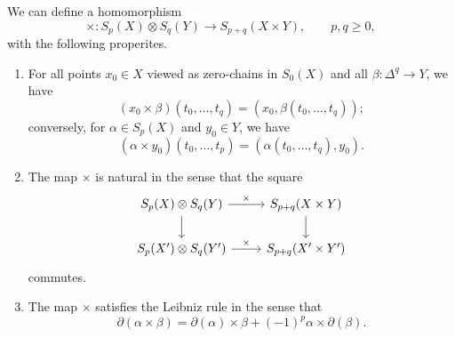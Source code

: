 \documentclass[main.tex]{subfiles}
\begin{document}
\begin{lemma}
  \label{lemma:existence_of_homology_cross_product}
  We can define a homomorphism
  \begin{equation*}
    \times\colon S_{p}(X) \otimes S_{q}(Y) \to S_{p+q}(X \times Y), \qquad p,q \geq 0,
  \end{equation*}
  with the following properites.
  \begin{enumerate}
    \item For all points $x_{0} \in X$ viewed as zero-chains in $S_{0}(X)$ and all $\beta\colon \Delta^{q} \to Y$, we have
      \begin{equation*}
        (x_{0} \times \beta)(t_{0}, \ldots, t_{q}) = (x_{0}, \beta(t_{0}, \ldots, t_{q}));
      \end{equation*}
      conversely, for $\alpha \in S_{p}(X)$ and $y_{0} \in Y$, we have
      \begin{equation*}
        (\alpha \times y_{0})(t_{0}, \ldots, t_{p}) = (\alpha(t_{0}, \ldots, t_{q}), y_{0}).
      \end{equation*}

    \item The map $\times$ is natural in the sense that the square
      \begin{equation*}
        \begin{tikzcd}
          S_{p}(X) \otimes S_{q}(Y)
          \arrow[r, "\times"]
          \arrow[d]
          & S_{p+q}(X \times Y)
          \arrow[d]
          \\
          S_{p}(X') \otimes S_{q}(Y')
          \arrow[r, "\times"]
          & S_{p+q}(X' \times Y')
        \end{tikzcd}
      \end{equation*}
      commutes.

    \item The map $\times$ satisfies the Leibniz rule in the sense that
      \begin{equation*}
        \partial(\alpha \times \beta) = \partial(\alpha) \times \beta + (-1)^{p} \alpha \times \partial(\beta).
      \end{equation*}
  \end{enumerate}
\end{lemma}
\end{document}
